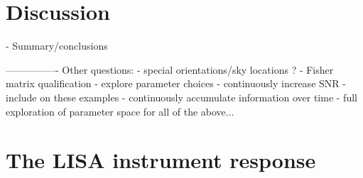 \documentclass[aps,showpacs,twocolumn,prd,superscriptaddress,nofootinbib]{revtex4-1}
\begin{document}

\section{Discussion}
\label{sec:discussion}

- Summary/conclusions


----------------
Other questions:
- special orientations/sky locations ?
- Fisher matrix qualification - explore parameter choices
- continuously increase SNR - include on these examples
- continuously accumulate information over time
- full exploration of parameter space for all of the above...



\appendix


\section{The LISA instrument response}
\label{sec:response}
\end{document}
